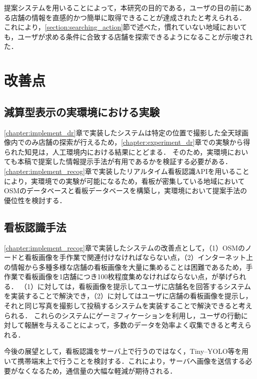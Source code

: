   提案システムを用いることによって，本研究の目的である，ユーザの目の前にある店舗の情報を直感的かつ簡単に取得できることが達成されたと考えられる．
  これにより，\ref{section:searching_action}節で述べた，慣れていない地域においても，ユーザが求める条件に合致する店舗を探索できるようになることが示唆された．

\section{改善点}
  \subsection{減算型表示の実環境における実験}
    \ref{chapter:implement_dr}章で実装したシステムは特定の位置で撮影した全天球画像内でのみ店舗の探索が行えるため，\ref{chapter:experiment_dr}章での実験から得られた知見は，人工環境内における結果にとどまる．
    そのため，実環境においても本稿で提案した情報提示手法が有用であるかを検証する必要がある．
    \ref{chapter:implement_recog}章で実装したリアルタイム看板認識APIを用いることにより，実環境での実験が可能になるため，看板が密集している地域においてOSMのデータベースと看板データベースを構築し，実環境において提案手法の優位性を検討する．

  \subsection{看板認識手法}
    \ref{chapter:implement_recog}章で実装したシステムの改善点として，（1）OSMのノードと看板画像を手作業で関連付けなければならない点，（2）インターネット上の情報から多種多様な店舗の看板画像を大量に集めることは困難であるため，手作業で看板画像を1店舗につき100枚程度集めなければならない点，が挙げられる．
    （1）に対しては，看板画像を提示してユーザに店舗名を回答するシステムを実装することで解決でき，（2）に対してはユーザに店舗の看板画像を提示し，それと同じ写真を撮影して投稿するシステムを実装することで解決できると考えられる．
    これらのシステムにゲーミフィケーションを利用し，ユーザの行動に対して報酬を与えることによって，多数のデータを効率よく収集できると考えられる．
    
    今後の展望として，看板認識をサーバ上で行うのではなく，Tiny--YOLO等を用いて携帯端末上で行うことを検討する．これにより，サーバへ画像を送信する必要がなくなるため，通信量の大幅な軽減が期待される．

